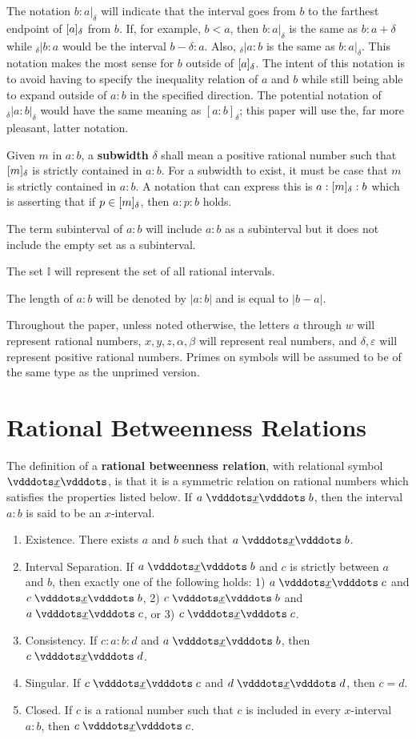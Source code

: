 \documentclass[12pt]{article}
\begin{document}
The notation $b:a|_\delta$ will indicate that the interval goes from $b$ to the farthest endpoint of $[a]_{\delta}$ from $b$. If, for example, $b < a$, then $b:a|_\delta$ is the same as $b:a+\delta$ while ${}_\delta|b:a$ would be the interval $b-\delta:a$. Also, ${}_\delta|a : b$ is the same as $b:a|_\delta$. This notation makes the most sense for $b$ outside of $[a]_{\delta}$. The intent of this notation is to avoid having to specify the inequality relation of $a$ and $b$ while still being able to expand outside of $a:b$ in the specified direction. The potential notation of ${}_\delta | a:b|_\delta$ would have the same meaning as $[a:b]_\delta$; this paper will use the, far more pleasant, latter notation. 

Given $m$ in $a:b$, a \textbf{subwidth} $\delta$ shall mean a positive rational number such that $[m]_{\delta}$ is strictly contained in $a:b$. For a subwidth to exist, it must be case that $m$ is strictly contained in $a:b$. A notation that can express this is $a: [m]_{\delta} :b$ which is asserting that if $p \in [m]_{\delta}$, then $a: p :b$ holds. 

The term subinterval of $a:b$ will include $a:b$ as a subinterval but it does not include the empty set as a subinterval. 

The set $\mathbb{I}$ will represent the set of all rational intervals. 

The length of $a:b$ will be denoted by $|a:b|$ and is equal to $|b-a|$.

Throughout the paper, unless noted otherwise, the letters $a$ through $w$ will represent rational numbers, $x, y, z, \alpha, \beta$ will represent real numbers, and $\delta, \varepsilon$ will represent positive rational numbers. Primes on symbols will be assumed to be of the same type as the unprimed version. 

\section{Rational Betweenness Relations}

The definition of a \textbf{rational betweenness relation}, with relational symbol $\xrel$, is that it is a symmetric relation on rational numbers which satisfies the properties listed below. If $a \xrel b$, then the interval $a:b$ is said to be an $x$-interval. 
\begin{enumerate}
    \item Existence. There exists $a$ and $b$ such that $a\xrel b$.
    \item Interval Separation. If $a \xrel b$ and $c$ is strictly between $a$ and $b$, then exactly one of the following holds: 1) $a \xrel c$ and \sout{$c \xrel b$}, 2) $c \xrel b$ and \sout{$a \xrel c$}, or 3) $c \xrel c$. 
    \item Consistency. If $c : a : b : d$ and $a \xrel b$, then $c \xrel d$. 
    \item Singular. If $c \xrel c$ and $d \xrel d$, then $c=d$. 
    \item Closed. If $c$ is a rational number such that $c$ is included in every $x$-interval $a:b$, then  $c \xrel c$. 
\end{enumerate}
\end{document}
